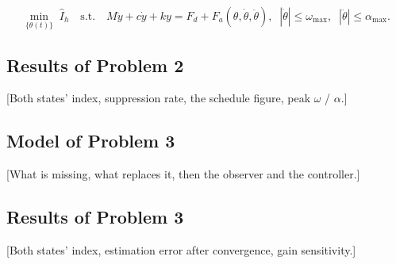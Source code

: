\begin{equation}
  \min_{\{\theta(t)\}} \; \hat I_h
  \quad\text{s.t.}\quad
  M\ddot y + c\dot y + k y = F_d + F_a(\theta,\dot\theta,\ddot\theta),\;\;
  |\dot\theta|\le \omega_{\max},\;\; |\ddot\theta|\le \alpha_{\max}.
\end{equation}

\subsection{Results of Problem 2}
[Both states' index, suppression rate, the schedule figure, peak $\omega$ / $\alpha$.]

\subsection{Model of Problem 3}
[What is missing, what replaces it, then the observer and the controller.]

\subsection{Results of Problem 3}
[Both states' index, estimation error after convergence, gain sensitivity.]

